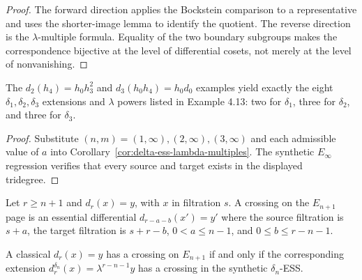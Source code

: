 \begin{proof}
  The forward direction applies the Bockstein comparison to a representative
  and uses the shorter-image lemma to identify the quotient.  The reverse
  direction is the $\lambda$-multiple formula.  Equality of the two boundary
  subgroups makes the correspondence bijective at the level of differential
  cosets, not merely at the level of nonvanishing.
\end{proof}

\begin{proposition}
  \label{prop:delta-14-stem-regression}
  \notready
  The $d_2(h_4)=h_0h_3^2$ and
  $d_3(h_0h_4)=h_0d_0$ examples yield exactly the eight
  $\delta_1,\delta_2,\delta_3$ extensions and $\lambda$ powers listed in
  Example 4.13: two for $\delta_1$, three for $\delta_2$, and three for
  $\delta_3$.
\end{proposition}

\begin{proof}
  Substitute $(n,m)=(1,\infty),(2,\infty),(3,\infty)$ and each admissible
  value of $a$ into Corollary~\ref{cor:delta-ess-lambda-multiples}.  The
  synthetic $E_\infty$ regression verifies that every source and target exists
  in the displayed tridegree.
\end{proof}

\begin{definition}
  \label{def:classical-differential-crossing}
  \notready
  Let $r\ge n+1$ and $d_r(x)=y$, with $x$ in filtration $s$.  A crossing on
  the $E_{n+1}$ page is an essential differential
  $d_{r-a-b}(x')=y'$ where the source filtration is $s+a$, the target
  filtration is $s+r-b$, $0<a\le n-1$, and
  $0\le b\le r-n-1$.
\end{definition}

\begin{proposition}
  \label{prop:classical-crossing-iff-delta-crossing}
  \notready
  A classical $d_r(x)=y$ has a crossing on $E_{n+1}$ if and only if the
  corresponding extension
  $d_r^{\delta_n}(x)=\lambda^{r-n-1}y$ has a crossing in the synthetic
  $\delta_n$-ESS.
\end{proposition}

